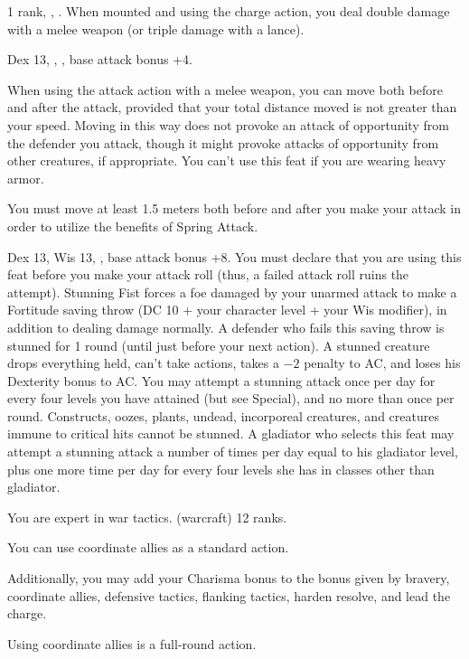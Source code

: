 { 1 rank, , .}
{When mounted and using the charge action, you deal double damage with a melee weapon (or triple damage with a lance).}

{Dex 13, , , base attack bonus +4.}
{When using the attack action with a melee weapon, you can move both before and after the attack, provided that your total distance moved is not greater than your speed. Moving in this way does not provoke an attack of opportunity from the defender you attack, though it might provoke attacks of opportunity from other creatures, if appropriate. You can't use this feat if you are wearing heavy armor.

You must move at least 1.5 meters both before and after you make your attack in order to utilize the benefits of Spring Attack.}

{}
{Dex 13, Wis 13, , base attack bonus +8.}
{You must declare that you are using this feat before you make your attack roll (thus, a failed attack roll ruins the attempt). Stunning Fist forces a foe damaged by your unarmed attack to make a Fortitude saving throw (DC 10 + \onehalf your character level + your Wis modifier), in addition to dealing damage normally. A defender who fails this saving throw is stunned for 1 round (until just before your next action). A stunned creature drops everything held, can't take actions, takes a $-2$ penalty to AC, and loses his Dexterity bonus to AC. You may attempt a stunning attack once per day for every four levels you have attained (but see Special), and no more than once per round. Constructs, oozes, plants, undead, incorporeal creatures, and creatures immune to critical hits cannot be stunned.}
{}
{A gladiator who selects this feat may attempt a stunning attack a number of times per day equal to his gladiator level, plus one more time per day for every four levels she has in classes other than gladiator.}

{You are expert in war tactics.}
{ (warcraft) 12 ranks.}
{You can use coordinate allies as a standard action.

Additionally, you may add your Charisma bonus to the bonus given by bravery, coordinate allies, defensive tactics, flanking tactics, harden resolve, and lead the charge.
}
{Using coordinate allies is a full-round action.}{}

